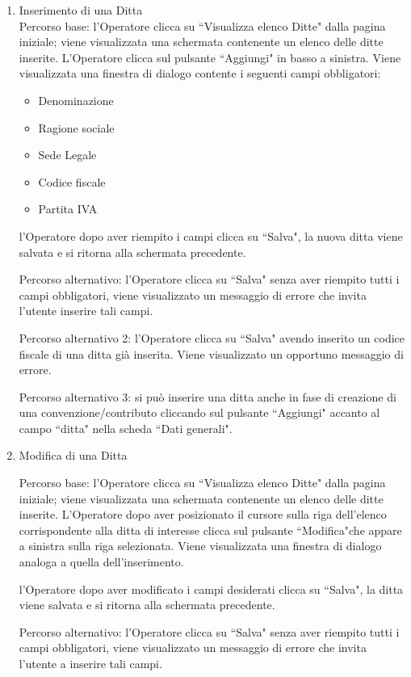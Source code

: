 \begin{enumerate}
\begin{enumerate}
\item Inserimento di una Ditta\\ \label{UC_new_company}
Percorso base:
l'Operatore clicca su ``Visualizza elenco Ditte" dalla pagina iniziale; viene visualizzata una schermata contenente un elenco delle ditte inserite. L'Operatore clicca sul pulsante ``Aggiungi" in basso a sinistra. Viene visualizzata
una finestra di dialogo contente i seguenti campi obbligatori:
\begin{itemize}
 \item Denominazione
 \item Ragione sociale
 \item Sede Legale
 \item Codice fiscale
 \item Partita IVA
\end{itemize}
l'Operatore dopo aver riempito i campi clicca su ``Salva", la nuova ditta viene salvata e si ritorna alla schermata precedente.

Percorso alternativo:
l'Operatore clicca su ``Salva" senza aver riempito tutti i campi obbligatori, viene visualizzato un messaggio di errore che invita l'utente inserire tali campi.

Percorso alternativo 2:
l'Operatore clicca su ``Salva" avendo inserito un codice fiscale di una ditta già inserita. Viene visualizzato un opportuno messaggio di errore.

Percorso alternativo 3:
si può inserire una ditta anche in fase di creazione di una convenzione/contributo cliccando sul pulsante ``Aggiungi" accanto al campo ``ditta" nella scheda ``Dati generali".

\item Modifica di una Ditta\\ \label{UC_edit_company}

Percorso base:
l'Operatore clicca su ``Visualizza elenco Ditte" dalla pagina iniziale; viene visualizzata una schermata contenente un elenco delle ditte inserite. L'Operatore dopo aver posizionato il cursore sulla riga dell'elenco
corrispondente alla ditta di interesse clicca sul pulsante ``Modifica"che appare a sinistra sulla riga selezionata. Viene visualizzata
una finestra di dialogo analoga a quella dell'inserimento.

l'Operatore dopo aver modificato i campi desiderati clicca su ``Salva", la  ditta viene salvata e si ritorna alla schermata precedente.

Percorso alternativo:
l'Operatore clicca su ``Salva" senza aver riempito tutti i campi obbligatori, viene visualizzato un messaggio di errore che invita l'utente a inserire tali campi.


\end{enumerate}
\end{enumerate}
